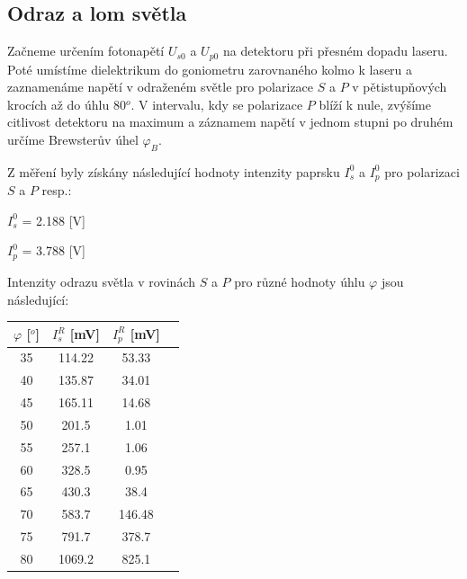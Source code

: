 \documentclass[a4paper,11pt]{article}
\begin{document}
\begin{minipage}[t]{0.5\textwidth}
        \subsection{Odraz a lom světla}
            Začneme určením fotonapětí $U_{s0}$ a $U_{p0}$ na detektoru při přesném dopadu laseru. Poté umístíme dielektrikum do goniometru zarovnaného kolmo k laseru a zaznamenáme napětí v odraženém světle pro polarizace $S$ a $P$ v pětistupňových krocích až do úhlu 80$^o$. V intervalu, kdy se polarizace $P$ blíží k nule, zvýšíme citlivost detektoru na maximum a záznamem napětí v jednom stupni po druhém určíme Brewsterův úhel $\varphi_B$.
            \vspace{5pt}
            \par Z měření byly získány následující hodnoty intenzity paprsku $I_s^0$ a $I_p^0$ pro polarizaci $S$ a $P$ resp.:
            \begin{center}
                $I_s^0$ = 2.188 [V]
                \vspace{5pt}
                \par $I_p^0$ = 3.788 [V]
            \end{center}
            Intenzity odrazu světla v rovinách $S$ a $P$ pro různé hodnoty úhlu $\varphi$ jsou následující:
            \vspace{10pt}
                \par \centering
                \begin{tabular}{|c|c|c|c|}
                    \hline
                    $\varphi$ [$^o$] &  $I_s^R$ [mV]  & $I_p^R$ [mV] \\
                    \hline
                    35 & 114.22 & 53.33 \\
                    \hline
                    40 & 135.87 & 34.01 \\
                    \hline
                    45 & 165.11 & 14.68 \\
                    \hline
                    50 & 201.5  & 1.01 \\
                    \hline
                    55 & 257.1  & 1.06 \\
                    \hline
                    60 & 328.5  & 0.95 \\
                    \hline
                    65 & 430.3  & 38.4 \\
                    \hline
                    70 & 583.7  & 146.48 \\
                    \hline
                    75 & 791.7  & 378.7 \\
                    \hline
                    80 & 1069.2  & 825.1 \\
                    \hline
                \end{tabular}
                \captionsetup{justification=centering, font=footnotesize}
                \vspace{20pt}
                \raggedright
    \end{minipage}
\end{document}

